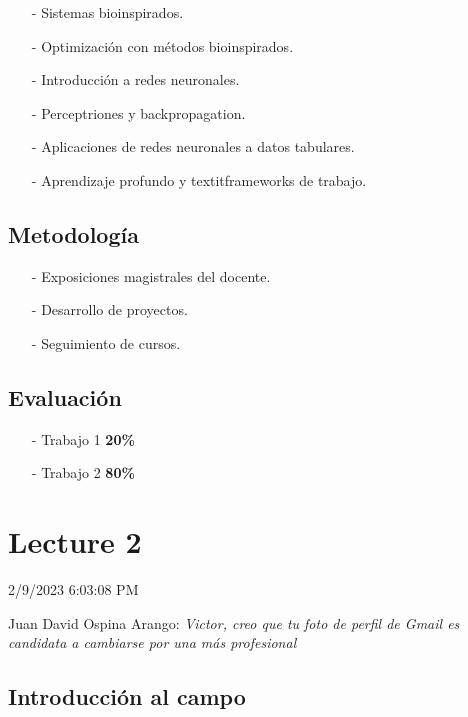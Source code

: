 \documentclass{article}
\theoremstyle{definition}
\begin{document}
\begin{itemize}

  \item[-] Sistemas bioinspirados.
  \item[-] Optimización con métodos bioinspirados.
  \item[-] Introducción a redes neuronales.
  \item[-] Perceptriones y backpropagation.
  \item[-] Aplicaciones de redes neuronales a datos tabulares.
  \item[-] Aprendizaje profundo y textit{frameworks} de trabajo.

\end{itemize}

\subsection{Metodología}

\begin{itemize}

  \item[-] Exposiciones magistrales del docente.
  \item[-] Desarrollo de proyectos.
  \item[-] Seguimiento de cursos.

\end{itemize}

\subsection{Evaluación}

\begin{itemize}

  \item[-] Trabajo 1 \textbf{20\%}
  \item[-] Trabajo 2 \textbf{80\%}

\end{itemize}

\section{Lecture 2}

2/9/2023 6:03:08 PM

Juan David Ospina Arango: \textit{Victor, creo que tu foto de perfil 
de Gmail es candidata a cambiarse 
por una más profesional}

\subsection{Introducción al campo}
\end{document}
